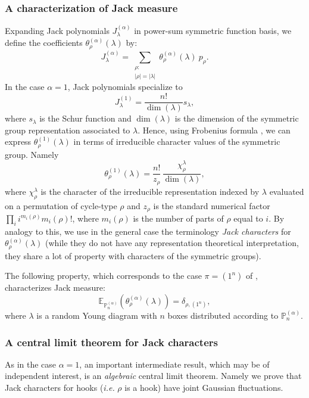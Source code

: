 \documentclass[11pt]{amsart}
\theoremstyle{plain}
\theoremstyle{remark}
\newcommand{\PP}{\mathbb{P}}
\newcommand{\esper}{\mathbb{E}}
\begin{document}
\subsubsection{A characterization of Jack measure}

Expanding Jack polynomials $J_\lambda^{(\alpha)}$ 
in power-sum symmetric function basis, 
we define the coefficients 
$\theta_{\rho}^{(\alpha)}(\lambda)$ by:
\begin{equation}
\label{eq:jack-characters}
J_\lambda^{(\alpha)}=\sum_{\substack{\rho: \\
|\rho|=|\lambda|}} 
\theta_{\rho}^{(\alpha)}(\lambda)\ p_{\rho}.
\end{equation}
In the case $\alpha=1$, Jack polynomials specialize to
\[J_\lambda^{(1)} = \frac{n!}{\dim(\lambda)} s_\lambda,\] 
where $s_\lambda$ is the Schur function and $\dim(\lambda)$ is
the dimension of the symmetric group representation associated to $\lambda$.
Hence, using Frobenius formula \cite[page 114]{Macdonald1995},
we can express $\theta_{\rho}^{(1)}(\lambda)$ in terms of irreducible character
values of the symmetric group. Namely
\[ \theta_\rho^{(1)}(\lambda)=\frac{n!}{z_\rho} \, \frac{\chi^{\lambda}_\rho}{\dim(\lambda)},\]
where $\chi^{\lambda}_\rho$ is the character of the irreducible
representation indexed by $\lambda$ evaluated on a permutation
of cycle-type $\rho$ and $z_\rho$ is the standard numerical factor $\prod_i i^{m_i(\rho)} m_i(\rho)!$, where $m_i(\rho)$ is the number of parts of $\rho$ equal to $i$.
By analogy to this, we use in the general case the terminology
{\em Jack characters} for $\theta_{\rho}^{(\alpha)}(\lambda)$
(while they do not have any representation theoretical interpretation,
they share a lot of property with characters of the symmetric groups).

The following property,
which corresponds to the case
$\pi=(1^n)$ of \cite[Equation (8.4)]{MatsumotoOddJM},
characterizes Jack measure: 
\begin{equation}
    \esper_{\PP_n^{(\alpha)}}( \theta^{(\alpha)}_\rho(\lambda) ) =
\delta_{\rho,(1^n)},
\label{eq:expect_Jack_character}
\end{equation}
where $\lambda$ is a random Young diagram with $n$ boxes distributed according to
$\PP_n^{(\alpha)}$.

\subsubsection{A central limit theorem for Jack characters}
As in the case $\alpha=1$, an important intermediate result, which may be of independent interest,
is an {\em algebraic} central limit theorem.
Namely we prove that Jack characters for hooks ({\em i.e.} $\rho$ is a hook)
have joint Gaussian fluctuations.
\end{document}
